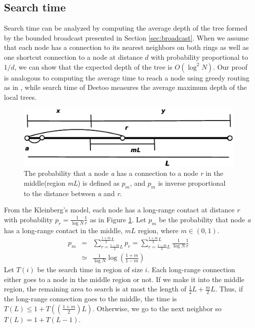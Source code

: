 \documentclass[conference]{IEEEtran}
\begin{document}
\subsection{Search time}
\label{sec:search_time}
Search time can be analyzed by computing the average
depth of the tree formed by the bounded broadcast presented in
Section \ref{sec:broadcast}. When we assume that each node 
has a connection to its nearest neighbors on both rings as well as
one shortcut connection to a node at distance $d$ with probability
proportional to $1/d$, we can show that the expected depth of the 
tree is $O(\log^2 N)$. 
Our proof is analogous to computing the average time 
to reach a node using greedy routing as in \cite{jk:Information,
pr:Symphony}, while search time of 
Deetoo measures the average maximum depth of the local trees.
\begin{figure}
\centering
\includegraphics[width=2.5 in]{searchtime}
\caption{The probability that a node \textit{a} has a connection to a node \textit{r} 
in the middle(region \textit{mL}) is defined as $p_{m}$, and $p_m$ is inverse 
proportional to the distance between \textit{a} and \textit{r}.} \label{fig:search}
\end{figure}
From the Kleinberg's model, each node has a long-range
contact at distance \textit{r} with probability 
$p_{r}=\frac{1}{\log N}\frac{1}{r}$ as in Figure \ref{fig:search}. 
Let \textit{$p_{m}$} be the probability that node \textit{a} has a long-range
contact in the middle, \textit{$mL$} region, where $m\in (0,1)$.
\begin{eqnarray*}
p_{m} &=& \sum_{r=\frac{1-m}{2}L}^{\frac{1+m}{2}L}p_{r} = \sum_{r=\frac{1-m}{2}L}^{\frac{1+m}{2}L}\frac{1}{\log
        N}\frac{1}{r}\\
        &\simeq& \frac{1}{\log N}\log\left(\frac{1+m}{1-m}\right)
\end{eqnarray*}
Let $T(i)$ be the search time in region of size $i$.
Each long-range connection either goes to a node in the
middle region or not.
If we make it into the middle region, the remaining area
to search is at most the length of $\frac{1}{2}L + \frac{m}{2}L$.
Thus,
if the long-range connection goes to the middle, the time is 
$T(L) \leq 1 + T((\frac{1+m}{2})L)$. 
Otherwise, we go to the next neighbor so $T(L) = 1 + T(L-1)$.
\end{document}
